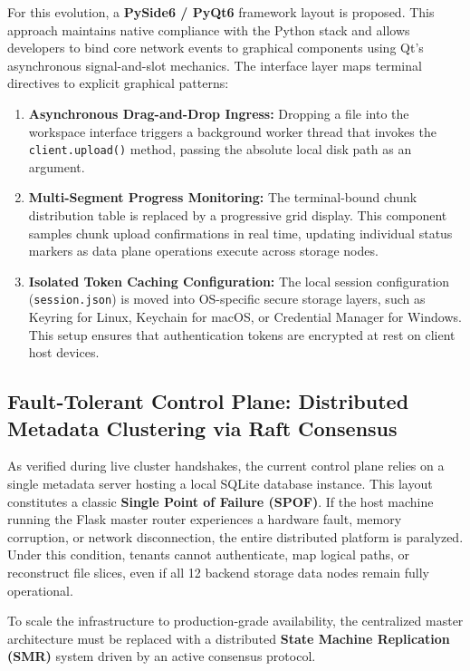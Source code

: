 For this evolution, a \textbf{PySide6 / PyQt6} framework layout is proposed. This approach maintains native compliance with the Python stack and allows developers to bind core network events to graphical components using Qt's asynchronous signal-and-slot mechanics. The interface layer maps terminal directives to explicit graphical patterns:
\begin{enumerate}
    \item \textbf{Asynchronous Drag-and-Drop Ingress:} Dropping a file into the workspace interface triggers a background worker thread that invokes the \texttt{client.upload()} method, passing the absolute local disk path as an argument.
    \item \textbf{Multi-Segment Progress Monitoring:} The terminal-bound chunk distribution table is replaced by a progressive grid display. This component samples chunk upload confirmations in real time, updating individual status markers as data plane operations execute across storage nodes.
    \item \textbf{Isolated Token Caching Configuration:} The local session configuration (\texttt{session.json}) is moved into OS-specific secure storage layers, such as Keyring for Linux, Keychain for macOS, or Credential Manager for Windows. This setup ensures that authentication tokens are encrypted at rest on client host devices.
\end{enumerate}

\subsection{Fault-Tolerant Control Plane: Distributed Metadata Clustering via Raft Consensus}
As verified during live cluster handshakes, the current control plane relies on a single metadata server hosting a local SQLite database instance. This layout constitutes a classic \textbf{Single Point of Failure (SPOF)}. If the host machine running the Flask master router experiences a hardware fault, memory corruption, or network disconnection, the entire distributed platform is paralyzed. Under this condition, tenants cannot authenticate, map logical paths, or reconstruct file slices, even if all 12 backend storage data nodes remain fully operational.

To scale the infrastructure to production-grade availability, the centralized master architecture must be replaced with a distributed \textbf{State Machine Replication (SMR)} system driven by an active consensus protocol.

